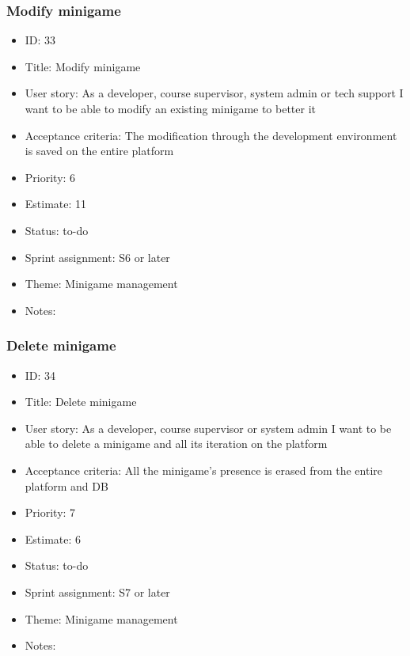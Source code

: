 \subsubsection{Modify minigame}
\begin{itemize}
	\item ID: 33
	\item Title: Modify minigame
	\item User story: As a developer, course supervisor, system admin or tech support I want to be able to modify an existing minigame to better it
	\item Acceptance criteria: The modification through the development environment is saved on the entire platform
	\item Priority: 6
	\item Estimate: 11
	\item Status: to-do
	\item Sprint assignment: S6 or later
	\item Theme: Minigame management
	\item Notes:
\end{itemize}

\subsubsection{Delete minigame}
\begin{itemize}
	\item ID: 34
	\item Title: Delete minigame
	\item User story: As a developer, course supervisor or system admin I want to be able to delete a minigame and all its iteration on the platform
	\item Acceptance criteria: All the minigame's presence is erased from the entire platform and DB 
	\item Priority: 7
	\item Estimate: 6
	\item Status: to-do
	\item Sprint assignment: S7 or later
	\item Theme: Minigame management
	\item Notes:
\end{itemize}

